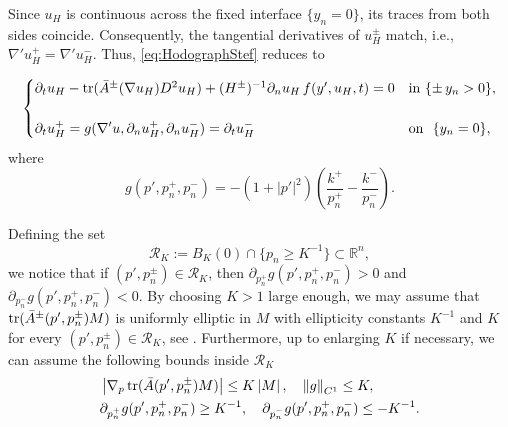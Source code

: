 \documentclass[12pt]{article}
\newcommand{\norm}[1]{\left\lVert#1\right\rVert}
\newcommand{\nor}[1]{\left\lvert#1\right\rvert}
\numberwithin{Theorem}{section}
\theoremstyle{definition}
\theoremstyle{remark}
\numberwithin{equation}{section}
\DeclareMathOperator*{\tr}{tr}
\newcommand{\p}{\partial}
\begin{document}
Since $u_H$ is continuous across the fixed interface $\{y_n=0\}$, its traces from both sides coincide. Consequently, the tangential derivatives of $u_H^\pm$ match, i.e., $\nabla' u_H^+ = \nabla' u_H^-$. Thus, \eqref{eq:HodographStef} reduces to
 
\begin{equation}\label{eq:ReduHodoStef}
        \begin{cases}
        \partial_{t} u_H - \tr( \Bar{A}^{\pm}(\nabla u_H) D^2 u_H) + (H^{\pm})^{-1} \partial_{n}u_H \,  f(y',u_H,t)=0 & \text{in} \,\, \{ \pm \, y_n > 0 \},\\
~
         \\
       \displaystyle \partial_{t} u_H^+ =g(\nabla' u, \p_n u_H^+, \p_n u_H^- )= \partial_{t} u_H^-& \text{on} \,\,  \,\, \{ y_n = 0 \},
    \end{cases}
    \end{equation}
where  
\begin{equation}\label{eq:def_g}
g(p', p_n^+, p_n^- )= -\left(1 +  |p'|^2 \right) \left(\frac{k^{+}}{p_n^+} - \frac{k^{-}}{p_n^-} \right).
    \end{equation}

    Defining the set 
\begin{equation*}
    \mathcal{R}_K:= B_{K}(0) \cap \{ p_n  \geq K^{-1}\} \subset \mathbb{R}^{n},
\end{equation*}
we notice that if $(p',p_n^\pm)\in \mathcal{R}_K$, then $\partial_{p_{n}^+} g(p',p_n^+,p_n^-) > 0$ and $\partial_{p_{n}^-} g(p',p_n^+,p_n^-) < 0$. 
By choosing $K > 1$ large enough, we may assume that $\tr(\Bar{A}^{\pm}(p',p_n^\pm)M)$ is uniformly elliptic in $M$ with ellipticity constants $K^{-1}$ and $K$ for every $(p',p_n^\pm) \in \mathcal{R}_K$, see \cite[Section 3]{ferrari2026free}.
Furthermore, up to enlarging $K$ if necessary, we can assume the following bounds inside $\mathcal{R}_K$
\begin{equation}\label{eq:boundg}
\begin{aligned}
        &\nor{\nabla_{p} \tr(\Bar{A}(p',p_n^\pm)M)} \leq K \nor{M}, \quad \norm{g}_{C^1} \leq K,  \\   & \partial_{p_{n}^+} g(p',p_n^+,p_n^-)  \geq K^{-1}, \quad \partial_{p_{n}^-} g(p',p_n^+,p_n^-)  \leq - K^{-1}.
\end{aligned}
\end{equation}
\end{document}
